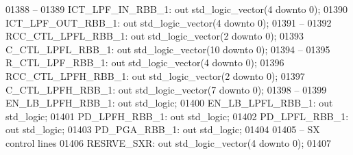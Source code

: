 \begin{DoxyCode}
01388 \textcolor{keyword}{        --}
01389         ICT\_LPF\_IN\_RBB\_1:   \textcolor{keywordflow}{out} \textcolor{comment}{std\_logic\_vector}(\textcolor{vhdllogic}{}\textcolor{vhdllogic}{4} \textcolor{keywordflow}{downto} \textcolor{vhdllogic}{}\textcolor{vhdllogic}{0});
01390         ICT\_LPF\_OUT\_RBB\_1:  \textcolor{keywordflow}{out} \textcolor{comment}{std\_logic\_vector}(\textcolor{vhdllogic}{}\textcolor{vhdllogic}{4} \textcolor{keywordflow}{downto} \textcolor{vhdllogic}{}\textcolor{vhdllogic}{0});
01391 \textcolor{keyword}{        --}
01392         RCC\_CTL\_LPFL\_RBB\_1: \textcolor{keywordflow}{out} \textcolor{comment}{std\_logic\_vector}(\textcolor{vhdllogic}{}\textcolor{vhdllogic}{2} \textcolor{keywordflow}{downto} \textcolor{vhdllogic}{}\textcolor{vhdllogic}{0});
01393         C\_CTL\_LPFL\_RBB\_1:   \textcolor{keywordflow}{out} \textcolor{comment}{std\_logic\_vector}(\textcolor{vhdllogic}{}\textcolor{vhdllogic}{10} \textcolor{keywordflow}{downto} \textcolor{vhdllogic}{}\textcolor{vhdllogic}{0});
01394 \textcolor{keyword}{        --}
01395         R\_CTL\_LPF\_RBB\_1:    \textcolor{keywordflow}{out} \textcolor{comment}{std\_logic\_vector}(\textcolor{vhdllogic}{}\textcolor{vhdllogic}{4} \textcolor{keywordflow}{downto} \textcolor{vhdllogic}{}\textcolor{vhdllogic}{0});
01396         RCC\_CTL\_LPFH\_RBB\_1: \textcolor{keywordflow}{out} \textcolor{comment}{std\_logic\_vector}(\textcolor{vhdllogic}{}\textcolor{vhdllogic}{2} \textcolor{keywordflow}{downto} \textcolor{vhdllogic}{}\textcolor{vhdllogic}{0});
01397         C\_CTL\_LPFH\_RBB\_1:   \textcolor{keywordflow}{out} \textcolor{comment}{std\_logic\_vector}(\textcolor{vhdllogic}{}\textcolor{vhdllogic}{7} \textcolor{keywordflow}{downto} \textcolor{vhdllogic}{}\textcolor{vhdllogic}{0});
01398 \textcolor{keyword}{        --}
01399         EN\_LB\_LPFH\_RBB\_1:   \textcolor{keywordflow}{out} \textcolor{comment}{std\_logic};
01400         EN\_LB\_LPFL\_RBB\_1:   \textcolor{keywordflow}{out} \textcolor{comment}{std\_logic};
01401         PD\_LPFH\_RBB\_1:  \textcolor{keywordflow}{out} \textcolor{comment}{std\_logic};
01402         PD\_LPFL\_RBB\_1:  \textcolor{keywordflow}{out} \textcolor{comment}{std\_logic};
01403         PD\_PGA\_RBB\_1:   \textcolor{keywordflow}{out} \textcolor{comment}{std\_logic};
01404         
01405 \textcolor{keyword}{        -- SX control lines }
01406         RESRVE\_SXR:     \textcolor{keywordflow}{out} \textcolor{comment}{std\_logic\_vector}(\textcolor{vhdllogic}{}\textcolor{vhdllogic}{4} \textcolor{keywordflow}{downto} \textcolor{vhdllogic}{}\textcolor{vhdllogic}{0});
01407 

\end{DoxyCode}
